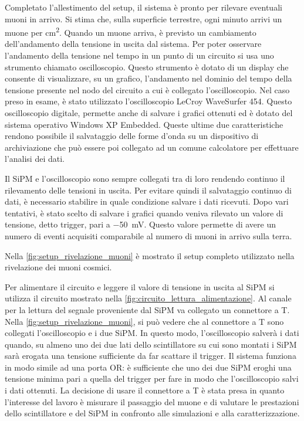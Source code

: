 Completato l'allestimento del setup, il sistema è pronto per rilevare eventuali muoni in arrivo. Si stima che, sulla superficie terrestre, ogni
minuto arrivi un muone per \si{\square\centi\meter}. Quando un muone arriva, è previsto un cambiamento dell'andamento della tensione in uscita
dal sistema. Per poter osservare l'andamento della tensione nel tempo in un punto di un circuito si usa uno strumento chiamato oscilloscopio.
Questo strumento è dotato di un display che consente di visualizzare, su un grafico, l'andamento nel dominio del tempo della tensione presente
nel nodo del circuito a cui è collegato l'oscilloscopio.
Nel caso preso in esame, è stato utilizzato l'oscilloscopio LeCroy WaveSurfer 454. Questo oscilloscopio digitale, permette anche di salvare
i grafici ottenuti ed è dotato del sistema operativo Windows XP Embedded. Queste ultime due caratteristiche rendono possibile il salvataggio
delle forme d'onda su un dispositivo di archiviazione che può essere poi collegato ad un comune calcolatore per effettuare l'analisi dei dati.

Il SiPM e l'oscilloscopio sono sempre collegati tra di loro rendendo continuo il rilevamento delle tensioni in uscita.
Per evitare quindi il salvataggio continuo di dati, è necessario stabilire in quale condizione salvare i dati ricevuti.
Dopo vari tentativi, è stato scelto di salvare i grafici quando veniva rilevato un valore di tensione, detto trigger, pari a \SI{-50}{\milli\volt}.
Questo valore permette di avere un numero di eventi acquisiti comparabile al numero di muoni in arrivo sulla terra.

Nella \autoref*{fig:setup_rivelazione_muoni} è mostrato il setup completo utilizzato nella rivelazione dei muoni cosmici.

Per alimentare il circuito e leggere il valore di tensione in uscita al SiPM si utilizza il circuito mostrato nella \autoref*{fig:circuito_lettura_alimentazione}.
Al canale per la lettura del segnale proveniente dal SiPM va collegato un connettore a T. Nella \autoref*{fig:setup_rivelazione_muoni}, si
può vedere che al connettore a T sono collegati l'oscilloscopio e i due SiPM. In questo modo, l'oscilloscopio salverà i dati quando, su almeno
uno dei due lati dello scintillatore su cui sono montati i SiPM sarà erogata una tensione sufficiente da far scattare il trigger. Il sistema
funziona in modo simile ad una porta OR: è sufficiente che uno dei due SiPM eroghi una tensione minima pari a quella del trigger per fare in
modo che l'oscilloscopio salvi i dati ottenuti. La decisione di usare il connettore a T è stata presa in quanto l'interesse del lavoro è misurare
il passaggio del muone e di valutare le prestazioni dello scintillatore e del SiPM in confronto alle simulazioni e alla caratterizzazione.

